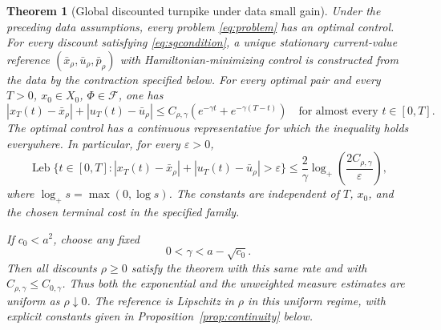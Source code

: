 \documentclass[11pt,a4paper]{article}
\newtheorem{theorem}{Theorem}
\newcommand{\Leb}{\operatorname{Leb}}
\newcommand{\logplus}{\log_{+}}
\begin{document}
\begin{theorem}[Global discounted turnpike under data small gain]\label{thm:main}
Under the preceding data assumptions, every problem \eqref{eq:problem}
has an optimal control. For every discount satisfying
\eqref{eq:sgcondition}, a unique stationary current-value reference
$(\bar x_\rho,\bar u_\rho,\bar p_\rho)$ with Hamiltonian-minimizing control
is constructed from the data by the contraction specified below.
For \emph{every} optimal pair and every $T>0$, $x_0\in X_0$,
$\Phi\in\mathcal F$, one has
\begin{equation}\label{eq:exp}
 |x_T(t)-\bar x_\rho|+|u_T(t)-\bar u_\rho|
 \leq C_{\rho,\gamma}
             \left(e^{-\gamma t}+e^{-\gamma(T-t)}\right)
 \quad\text{for almost every }t\in[0,T].
\end{equation}
The optimal control has a continuous representative for which the
inequality holds everywhere. In particular, for every $\varepsilon>0$,
\begin{equation}\label{eq:measure}
 \Leb\{t\in[0,T]:|x_T(t)-\bar x_\rho|
                   +|u_T(t)-\bar u_\rho|>\varepsilon\}
 \leq\frac2\gamma\logplus\left(\frac{2C_{\rho,\gamma}}\varepsilon\right),
\end{equation}
where $\logplus s=\max(0,\log s)$. The constants are independent of $T$,
$x_0$, and the chosen terminal cost in the specified family.

If $c_0<a^2$, choose any fixed
\begin{equation}\label{eq:uniformgamma}
 0<\gamma<a-\sqrt{c_0}.
\end{equation}
Then all discounts $\rho\geq0$ satisfy the theorem with this same rate
and with $C_{\rho,\gamma}\leq C_{0,\gamma}$. Thus both the exponential
and the unweighted measure estimates are uniform as $\rho\downarrow0$.
The reference is Lipschitz in $\rho$ in this uniform regime, with explicit
constants given in Proposition~\ref{prop:continuity} below.
\end{theorem}
\end{document}
